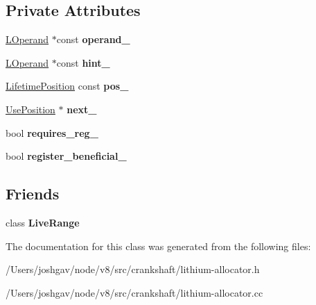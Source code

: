 \subsection*{Private Attributes}
\begin{DoxyCompactItemize}
\item 
\hyperlink{classv8_1_1internal_1_1_l_operand}{L\+Operand} $\ast$const {\bfseries operand\+\_\+}\hypertarget{classv8_1_1internal_1_1_use_position_ab509af0880208789dc21ab11c061640a}{}\label{classv8_1_1internal_1_1_use_position_ab509af0880208789dc21ab11c061640a}

\item 
\hyperlink{classv8_1_1internal_1_1_l_operand}{L\+Operand} $\ast$const {\bfseries hint\+\_\+}\hypertarget{classv8_1_1internal_1_1_use_position_ab8e1486b20643f7f57922a34f6d9ef64}{}\label{classv8_1_1internal_1_1_use_position_ab8e1486b20643f7f57922a34f6d9ef64}

\item 
\hyperlink{classv8_1_1internal_1_1_lifetime_position}{Lifetime\+Position} const {\bfseries pos\+\_\+}\hypertarget{classv8_1_1internal_1_1_use_position_a0bd473719118cceb9c18bb34794e7929}{}\label{classv8_1_1internal_1_1_use_position_a0bd473719118cceb9c18bb34794e7929}

\item 
\hyperlink{classv8_1_1internal_1_1_use_position}{Use\+Position} $\ast$ {\bfseries next\+\_\+}\hypertarget{classv8_1_1internal_1_1_use_position_a252d1522966c2600e286394b06f2de09}{}\label{classv8_1_1internal_1_1_use_position_a252d1522966c2600e286394b06f2de09}

\item 
bool {\bfseries requires\+\_\+reg\+\_\+}\hypertarget{classv8_1_1internal_1_1_use_position_ab4495747651df5ef44b52806b7ab9273}{}\label{classv8_1_1internal_1_1_use_position_ab4495747651df5ef44b52806b7ab9273}

\item 
bool {\bfseries register\+\_\+beneficial\+\_\+}\hypertarget{classv8_1_1internal_1_1_use_position_a0c2e0b4fcda949ca1a0e1c966640520d}{}\label{classv8_1_1internal_1_1_use_position_a0c2e0b4fcda949ca1a0e1c966640520d}

\end{DoxyCompactItemize}
\subsection*{Friends}
\begin{DoxyCompactItemize}
\item 
class {\bfseries Live\+Range}\hypertarget{classv8_1_1internal_1_1_use_position_a05b53ec81357069e15d5d0e582589f6a}{}\label{classv8_1_1internal_1_1_use_position_a05b53ec81357069e15d5d0e582589f6a}

\end{DoxyCompactItemize}


The documentation for this class was generated from the following files\+:\begin{DoxyCompactItemize}
\item 
/\+Users/joshgav/node/v8/src/crankshaft/lithium-\/allocator.\+h\item 
/\+Users/joshgav/node/v8/src/crankshaft/lithium-\/allocator.\+cc\end{DoxyCompactItemize}
